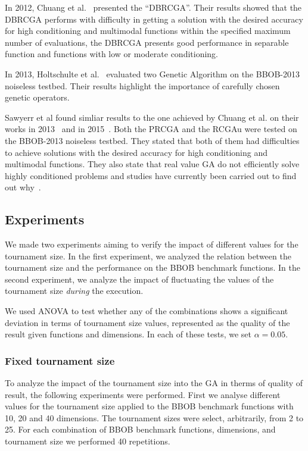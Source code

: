 In 2012, Chuang et al.~\cite{chuang2012black} presented the ``DBRCGA''. Their results showed that the DBRCGA performs with difficulty in getting a solution with the desired accuracy for high conditioning and multimodal functions within the specified maximum number of evaluations, the DBRCGA presents good performance in separable function and functions with low or moderate conditioning.

In 2013, Holtschulte et al.~\cite{holtschulte2013benchmarking} evaluated two Genetic Algorithm on the BBOB-2013 noiseless testbed. Their results highlight the importance of carefully chosen genetic operators.

Sawyerr et al found simliar results to the one achieved by Chuang et al. on their works in 2013~\cite{sawyerr2013benchmarking} and in 2015~\cite{sawyerr2015benchmarking}. Both the PRCGA and the RCGAu were tested on the BBOB-2013 noiseless testbed. They stated that both of them had difficulties to achieve solutions with the desired accuracy for high conditioning and multimodal functions. They also state that real value GA do not efficiently solve highly conditioned problems and studies have currently been carried out to find out why~\cite{sawyerr2015benchmarking}.




\label{sec:experiment}

\subsection{Experiments}
We made two experiments aiming to verify the impact of different values for the tournament size. In the first experiment, we analyzed the relation between the tournament size and the performance on the BBOB benchmark functions. In the second experiment, we analyze the impact of fluctuating the values of the tournament size \textit{during} the execution.

We used ANOVA to test whether any of the combinations shows a
significant deviation in terms of tournament size values, represented as the
quality of the result given functions and dimensions. In each of these tests, we set
$\alpha = 0.05$.

\subsubsection*{Fixed tournament size}

To analyze the impact of the tournament size into the GA in therms of quality of result, the following experiments were performed. First we analyse different values for the tournament size applied to the BBOB benchmark functions with 10, 20 and 40 dimensions. The tournament sizes were select, arbitrarily, from 2 to 25. For each combination of BBOB benchmark functions, dimensions, and tournament size we performed 40 repetitions.


